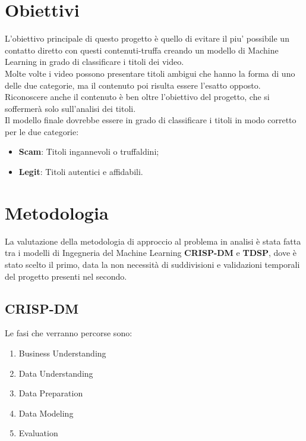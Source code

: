 \documentclass[a4paper,12pt]{report}
\begin{document}
\section{Obiettivi}
L'obiettivo principale di questo progetto è quello di evitare il piu' possibile un contatto diretto con questi contenuti-truffa creando un modello di Machine Learning in grado di classificare i titoli dei video.\\
Molte volte i video possono presentare titoli ambigui che hanno la forma di uno delle due categorie, ma il contenuto poi risulta essere l'esatto opposto.\\
Riconoscere anche il contenuto è ben oltre l'obiettivo del progetto, che si soffermerà solo sull'analisi dei titoli.\\
Il modello finale dovrebbe essere in grado di classificare i titoli in modo corretto per le due categorie:
\begin{itemize}
    \item \textbf{Scam}: Titoli ingannevoli o truffaldini;
    \item \textbf{Legit}: Titoli autentici e affidabili.
\end{itemize}

\newpage

\section{Metodologia}
La valutazione della metodologia di approccio al problema in analisi è stata fatta tra i modelli di Ingegneria del Machine Learning \textbf{CRISP-DM} e \textbf{TDSP}, dove è stato scelto il primo, data la non necessità di suddivisioni e validazioni temporali del progetto presenti nel secondo.

\subsection{CRISP-DM}
Le fasi che verranno percorse sono:
\begin{enumerate}
    \item Business Understanding
    \item Data Understanding
    \item Data Preparation
    \item Data Modeling
    \item Evaluation
\end{enumerate}

\newpage

\begingroup%
\makeatletter%
\let\clearpage\relax%
\vspace*{\fill}%
\vspace*{\dimexpr-50\p@-\baselineskip}%
\end{document}
